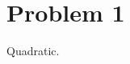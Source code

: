 \documentclass[../../main.tex]{subfiles}
\begin{document}
\section{Problem 1}
Quadratic.
\end{document}
